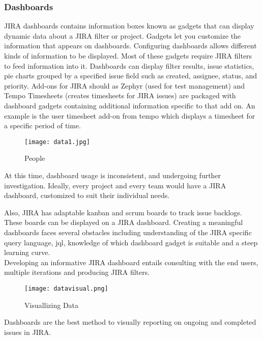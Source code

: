  \subsubsection{Dashboards}
 JIRA dashboards contains information boxes known as gadgets that can display dynamic data about a JIRA filter or project. Gadgets let you customize the information that appears on dashboards. Configuring dashboards allows different kinds of information to be displayed.  Most of these gadgets require JIRA filters to feed information into it. Dashboards can display filter results, issue statistics, pie charts grouped by a specified issue field such as created, assignee, status, and priority. Add-ons for JIRA should as Zephyr (used for test management) and Tempo Timesheets (creates timesheets for JIRA issues) are packaged with dashboard gadgets containing additional information specific to that add on. An example is the user timesheet add-on from tempo which displays a timesheet for a specific period of time.  \\ 
 \begin{figure}
 	\texttt{[image: data1.jpg]}
 	\caption{People}
 \end{figure}

At this time, dashboard usage is inconsistent, and undergoing further investigation. Ideally, every project and every team would have a JIRA dashboard, customized to suit their individual needs.  

Also, \gls{JIRA} has adaptable \gls{kanban} and \gls{scrum} boards to track issue backlogs. These boards can be displayed on a JIRA dashboard. Creating a meaningful dashboards faces several obstacles including understanding of the JIRA specific query language, \gls{jql}, knowledge of which dashboard gadget is suitable and a steep learning curve.  \\

Developing an informative \gls{JIRA} dashboard entails consulting with the end users, multiple iterations and producing JIRA filters.

 \begin{figure}
	\texttt{[image: datavisual.png]}
	\caption{Visuallizing Data}
 \end{figure}

Dashboards are the best method to visually reporting on ongoing and completed issues in \gls{JIRA}.

